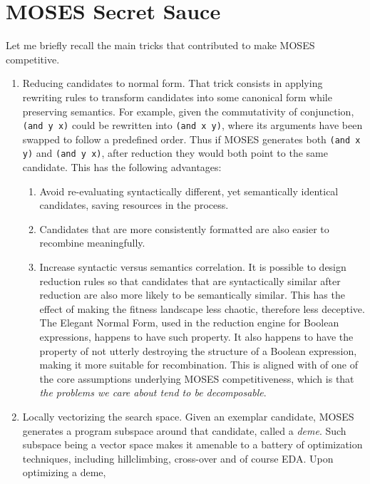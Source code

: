 \documentclass[]{report}
\begin{document}
\section{MOSES Secret Sauce}

Let me briefly recall the main tricks that contributed to make MOSES
competitive.

\begin{enumerate}
\item Reducing candidates to normal form.  That trick consists in
  applying rewriting rules to transform candidates into some
  canonical form while preserving semantics.  For example,
  given the commutativity of conjunction,
  \texttt{(and y x)}
  could be rewritten into \texttt{(and x y)},
  where its arguments have been swapped to follow a predefined order.
  Thus if MOSES
  generates both \texttt{(and x y)} and
  \texttt{(and y x)}, after reduction they would both
  point to the same candidate.  This has the following advantages:
\begin{enumerate}
\item Avoid re-evaluating syntactically different, yet semantically
  identical candidates, saving resources in the process.
\item Candidates that are more consistently formatted are also easier
  to recombine meaningfully.
\item Increase syntactic versus semantics correlation.  It is possible
  to design reduction rules so that candidates that are syntactically
  similar after reduction are also more likely to be semantically
  similar.  This has the effect of making the fitness landscape less
  chaotic, therefore less deceptive.  The Elegant Normal Form, used in
  the reduction engine for Boolean expressions, happens to have such
  property.  It also happens to have the property of not utterly
  destroying the structure of a Boolean expression, making it more
  suitable for recombination.  This is aligned with of one of the core
  assumptions underlying MOSES competitiveness, which is that
  \emph{the problems we care about tend to be decomposable}.
\end{enumerate}
\item Locally vectorizing the search space.  Given an exemplar
  candidate, MOSES generates a program subspace around that candidate,
  called a \emph{deme}.  Such subspace being a vector space makes it
  amenable to a battery of optimization techniques, including
  hillclimbing, cross-over and of course EDA.  Upon optimizing a deme,

\end{enumerate}
\end{document}
